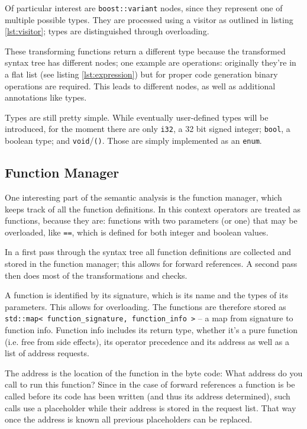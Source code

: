 		Of particular interest are \lstinline$boost::variant$ nodes, since they represent one of multiple possible types. They are processed using a visitor as outlined in listing \ref{lst:visitor}; types are distinguished through overloading.
		
		
		These transforming functions return a different type because the transformed syntax tree has different nodes; one example are operations: originally they're in a flat list (see listing \ref{lst:expression}) but for proper code generation binary operations are required. This leads to different nodes, as well as additional annotations like types.
		
		Types are still pretty simple. While eventually user-defined types will be introduced, for the moment there are only \lstinline$i32$, a 32 bit signed integer; \lstinline$bool$, a boolean type; and \lstinline$void$/\lstinline$()$. Those are simply implemented as an \lstinline$enum$.
		
		\subsection{Function Manager}
			
			One interesting part of the semantic analysis is the function manager, which keeps track of all the function definitions. In this context operators are treated as functions, because they are: functions with two parameters (or one) that may be overloaded, like \lstinline$==$, which is defined for both integer and boolean values.
			
			In a first pass through the syntax tree all function definitions are collected and stored in the function manager; this allows for forward references. A second pass then does most of the transformations and checks.
			
			A function is identified by its signature, which is its name and the types of its parameters. This allows for overloading. The functions are therefore stored as \lstinline$std::map< function_signature, function_info >$ -- a map from signature to function info. Function info includes its return type, whether it's a pure function (i.e. free from side effects), its operator precedence and its address as well as a list of address requests.
			
			The address is the location of the function in the byte code: What address do you call to run this function? Since in the case of forward references a function is be called before its code has been written (and thus its address determined), such calls use a placeholder while their address is stored in the request list. That way once the address is known all previous placeholders can be replaced.
			
